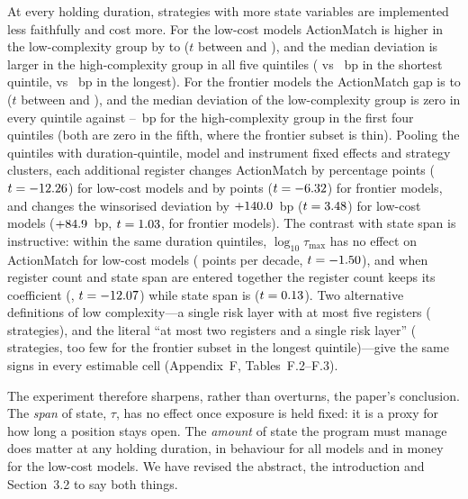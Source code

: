 \documentclass[11pt,a4paper]{article}
\begin{document}
At every holding duration, strategies with more state variables are implemented less faithfully and cost more. For the low-cost models ActionMatch is higher in the low-complexity group by \RevDurMedQTwoLowAMDiff{} to \RevDurMedQFourLowAMDiff{} ($t$ between \RevDurMedQTwoLowAMT{} and \RevDurMedQFourLowAMT), and the median deviation is larger in the high-complexity group in all five quintiles (\RevDurMedQOneLowISLo{} vs \RevDurMedQOneLowISHi~bp in the shortest quintile, \RevDurMedQFiveLowISLo{} vs \RevDurMedQFiveLowISHi~bp in the longest). For the frontier models the ActionMatch gap is \RevDurMedQTwoFrontAMDiff{} to \RevDurMedQFourFrontAMDiff{} ($t$ between \RevDurMedQTwoFrontAMT{} and \RevDurMedQFourFrontAMT), and the median deviation of the low-complexity group is zero in every quintile against \RevDurMedQOneFrontISHi--\RevDurMedQFourFrontISHi~bp for the high-complexity group in the first four quintiles (both are zero in the fifth, where the frontier subset is thin). Pooling the quintiles with duration-quintile, model and instrument fixed effects and strategy clusters, each additional register changes ActionMatch by \RevDurPoolLowAMReg{} percentage points ($t=-12.26$) for low-cost models and by \RevDurPoolFrontAMReg{} points ($t=-6.32$) for frontier models, and changes the winsorised deviation by $+140.0$~bp ($t=3.48$) for low-cost models ($+84.9$~bp, $t=1.03$, for frontier models). The contrast with state span is instructive: within the same duration quintiles, $\log_{10}\tau_{\max}$ has no effect on ActionMatch for low-cost models (\RevDurPoolLowAMTau{} points per decade, $t=-1.50$), and when register count and state span are entered together the register count keeps its coefficient (\RevDurPoolLowAMBothReg, $t=-12.07$) while state span is \RevDurPoolLowAMBothTau{} ($t=0.13$). Two alternative definitions of low complexity---a single risk layer with at most five registers (\RevAltTasks{} strategies), and the literal ``at most two registers and a single risk layer'' (\RevLitTasks{} strategies, too few for the frontier subset in the longest quintile)---give the same signs in every estimable cell (Appendix~F, Tables~F.2--F.3).

The experiment therefore sharpens, rather than overturns, the paper's conclusion. The \emph{span} of state, $\tau$, has no effect once exposure is held fixed: it is a proxy for how long a position stays open. The \emph{amount} of state the program must manage does matter at any holding duration, in behaviour for all models and in money for the low-cost models. We have revised the abstract, the introduction and Section~3.2 to say both things.
\end{document}
